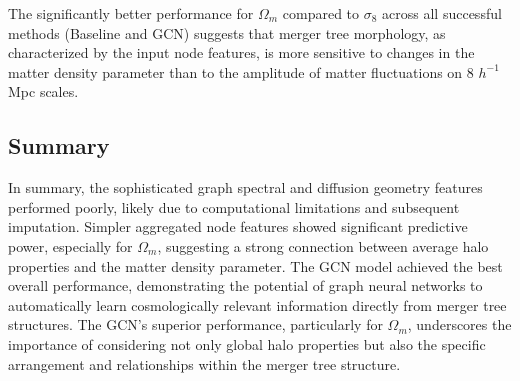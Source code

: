 \documentclass[twocolumn]{aastex631}
\begin{document}
The significantly better performance for $\Omega_m$ compared to $\sigma_8$ across all successful methods (Baseline and GCN) suggests that merger tree morphology, as characterized by the input node features, is more sensitive to changes in the matter density parameter than to the amplitude of matter fluctuations on 8 $h^{-1}$Mpc scales.

\subsection{Summary}

In summary, the sophisticated graph spectral and diffusion geometry features performed poorly, likely due to computational limitations and subsequent imputation. Simpler aggregated node features showed significant predictive power, especially for $\Omega_m$, suggesting a strong connection between average halo properties and the matter density parameter. The GCN model achieved the best overall performance, demonstrating the potential of graph neural networks to automatically learn cosmologically relevant information directly from merger tree structures. The GCN's superior performance, particularly for $\Omega_m$, underscores the importance of considering not only global halo properties but also the specific arrangement and relationships within the merger tree structure.
\end{document}

